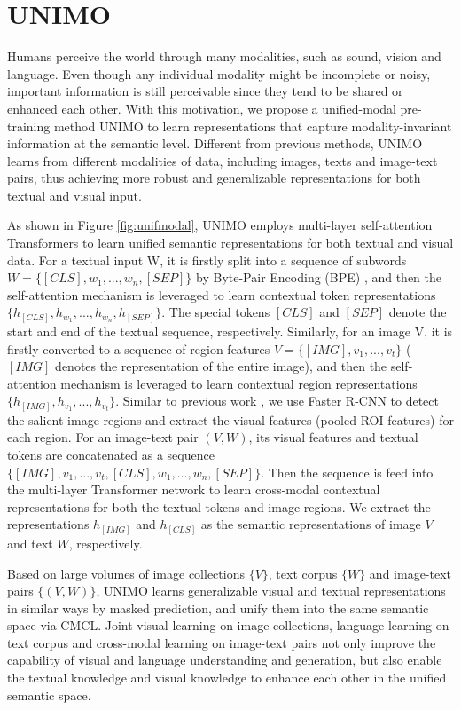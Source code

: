 \documentclass[11pt,a4paper]{article}
\begin{document}
\section{UNIMO}
\label{sec:unimo}

Humans perceive the world through many modalities, such as sound, vision and language. 
Even though any individual modality might be incomplete or noisy, important information is still perceivable since they tend to be shared or enhanced each other. 
With this motivation, we propose a unified-modal pre-training method UNIMO to learn representations that capture modality-invariant information at the semantic level.
Different from previous methods, UNIMO learns from different modalities of data, including images, texts and image-text pairs, thus achieving more robust and generalizable representations for both textual and visual input.


As shown in Figure \ref{fig:unifmodal}, UNIMO employs multi-layer self-attention Transformers to learn unified semantic representations for both textual and visual data.
For a textual input W, it is firstly split into a sequence of subwords $W=\{[CLS],w_1,...,w_n,[SEP]\}$ by Byte-Pair Encoding (BPE) \citep{sennrich-etal-2016-neural}, and then the self-attention mechanism is leveraged to learn contextual token representations $\{h_{[CLS]},h_{w_1}, ...,h_{w_n},h_{[SEP]}\}$. The special tokens $[CLS]$ and $[SEP]$ denote the start and end of the textual sequence, respectively.
Similarly, for an image V, it is firstly converted to a sequence of region features $V=\{[IMG],v_1, ...,v_t\}$ ($[IMG]$ denotes the representation of the entire image), and then the self-attention mechanism is leveraged to learn contextual region representations $\{h_{[IMG]}, h_{v_1}, ..., h_{v_t}\}$.
Similar to previous work \citep{chen2020uniter}, we use Faster R-CNN \citep{ren2016faster} to detect the salient image regions and extract the visual features (pooled ROI features) for each region.
For an image-text pair $(V, W)$, its visual features and textual tokens are concatenated as a sequence $\{[IMG], v_1, ..., v_t, [CLS],w_1,...,w_n,[SEP]\}$.
Then the sequence is feed into the multi-layer Transformer network to learn cross-modal contextual representations for both the textual tokens and image regions. 
We extract the representations $h_{[IMG]}$ and $h_{[CLS]}$ as the semantic representations of image $V$ and text $W$, respectively.

Based on large volumes of image collections $\{V\}$, text corpus $\{W\}$ and image-text pairs $\{(V,W)\}$, UNIMO learns generalizable visual and textual representations in similar ways by masked prediction, and unify them into the same semantic space via CMCL.
Joint visual learning on image collections, language learning on text corpus and cross-modal learning on image-text pairs not only improve the capability of visual and language understanding and generation, but also enable the textual knowledge and visual knowledge to enhance each other in the unified semantic space.
\end{document}
